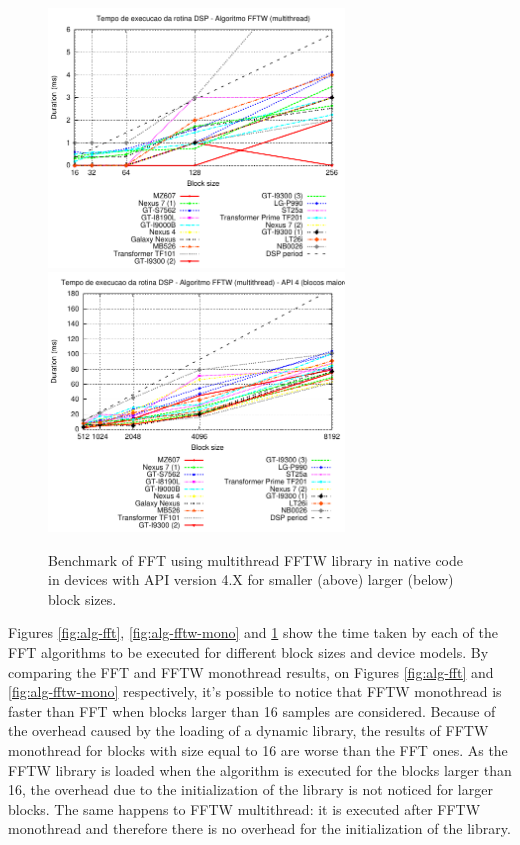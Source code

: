\documentclass[12pt]{article}
\begin{document}
\begin{figure}[h!]
\begin{center}
\includegraphics[width=0.7\textwidth]{img/FFTW_MULTI-4-a.pdf}
\includegraphics[width=0.7\textwidth]{img/FFTW_MULTI-4-b.pdf}
\end{center}
\caption{Benchmark of FFT using multithread FFTW library in native code in
devices with API version 4.X for smaller (above) larger (below) block sizes.}
\label{fig:alg-fftw-multi}
\end{figure}


Figures \ref{fig:alg-fft}, \ref{fig:alg-fftw-mono} and
\ref{fig:alg-fftw-multi} show the time taken by each of the FFT algorithms to
be executed for different block sizes and device models. By comparing the FFT
and FFTW monothread results, on Figures \ref{fig:alg-fft} and
\ref{fig:alg-fftw-mono} respectively, it's possible to notice that FFTW
monothread is faster than FFT when blocks larger than 16 samples are
considered. Because of the overhead caused by the loading of a dynamic
library, the results of FFTW monothread for blocks with size equal to 16 are
worse than the FFT ones. As the FFTW library is loaded when the algorithm is
executed for the blocks larger than 16, the overhead due to the initialization
of the library is not noticed for larger blocks. The same happens to FFTW
multithread: it is executed after FFTW monothread and therefore there is no
overhead for the initialization of the library.
\end{document}
